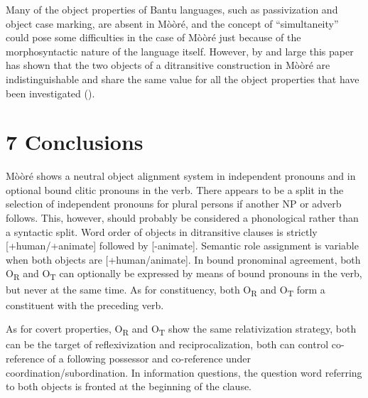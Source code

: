 \documentclass[output=paper]{langsci/langscibook}
\begin{document}
{{{{{{{Many of the object properties of Bantu languages, such as passivization and object case marking, are absent in M\`{o}\`{o}r\'{e}, and the concept of “simultaneity” could pose some difficulties in the case of M\`{o}\`{o}r\'{e} just because of the morphosyntactic nature of the language itself. However, by and large this paper has shown that the two objects of a ditransitive construction in M\`{o}\`{o}r\'{e} are indistinguishable and share the same value for all the object properties that have been investigated ().  

\chapter{7 Conclusions}

M\`{o}\`{o}r\'{e} shows a neutral object alignment system in independent pronouns and in optional bound clitic pronouns in the verb. There appears to be a split in the selection of independent pronouns for plural persons if another NP or adverb follows. This, however, should probably be considered a phonological rather than a syntactic split. Word order of objects in ditransitive clauses is strictly [+human/+animate] followed by [-animate]. Semantic role assignment is variable when both objects are [+human/animate]. In bound pronominal agreement, both O\textsubscript{R} and O\textsubscript{T} can optionally be expressed by means of bound pronouns in the verb, but never at the same time. As for constituency, both O\textsubscript{R} and O\textsubscript{T} form a constituent with the preceding verb. 

As for covert properties, O\textsubscript{R} and O\textsubscript{T} show the same relativization strategy, both can be the target of reflexivization and reciprocalization, both can control co-reference of a following possessor and co-reference under coordination/subordination. In information questions, the question word referring to both objects is fronted at the beginning of the clause. 

}}}}}}}
\end{document}
